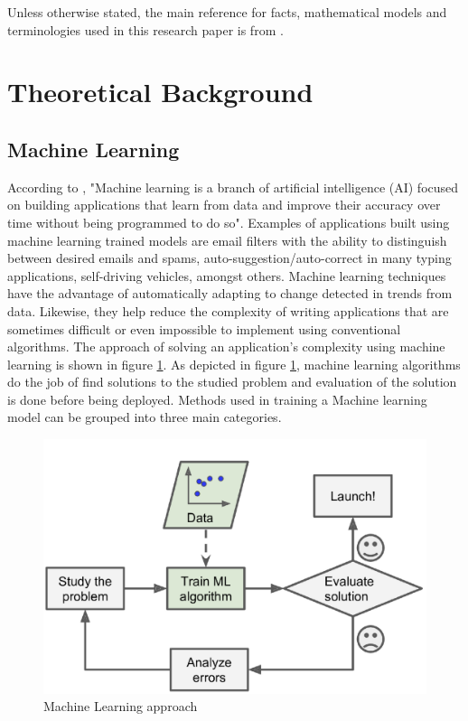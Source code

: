 \documentclass[conference]{IEEEtran}
\begin{document}
Unless otherwise stated, the main reference for facts, mathematical models and terminologies used in this research paper is from \cite{massaron2016regression}.
\section{Theoretical Background}
\subsection{Machine Learning}
According to \cite{ibm_cloud_education_2020}, "Machine learning is a branch of artificial intelligence (AI) focused on building applications that learn from data and improve their accuracy over time without being programmed to do so". Examples of applications built using machine learning trained models are email filters with the ability to distinguish between desired emails and spams, auto-suggestion/auto-correct in many typing applications, self-driving vehicles, amongst others. Machine learning techniques have the advantage of automatically adapting to change detected in trends from data. Likewise, they help reduce the complexity of writing applications that are sometimes difficult or even impossible to implement using conventional algorithms. The approach of solving an application's complexity using machine learning is shown in figure \ref{fig:machine_approach}. As depicted in figure \ref{fig:machine_approach}, machine learning algorithms do the job of find solutions to the studied problem and evaluation of the solution is done before being deployed. Methods used in training a Machine learning model can be grouped into three main categories.

\newpage
\begin{figure}[htbp]
	\centerline{\includegraphics [scale=0.32]{figures/machine_approach.png}}
	\caption{Machine Learning approach \cite{geron2019hands}}
	\label{fig:machine_approach}
\end{figure}
\end{document}
